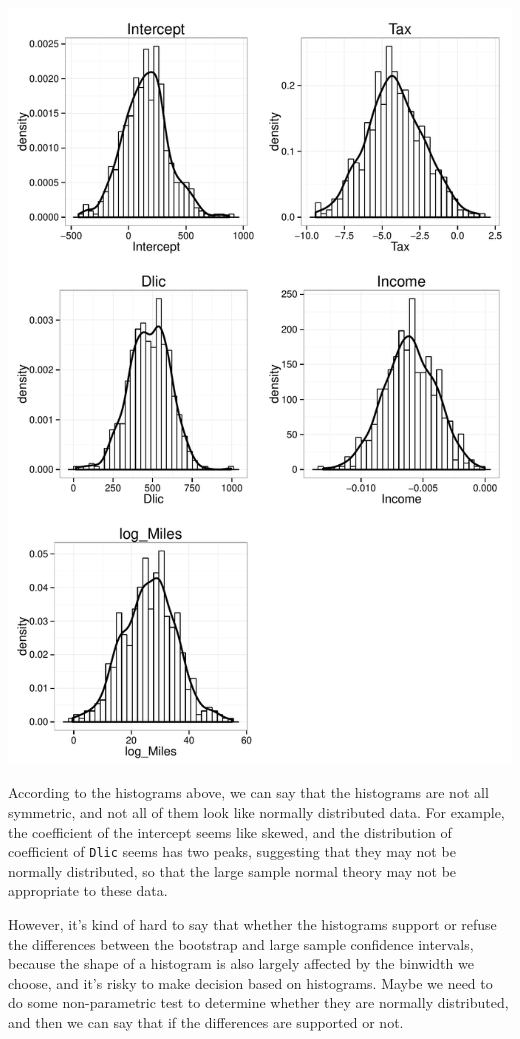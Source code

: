 \documentclass[12pt,oneside,a4paper]{article}\usepackage[]{graphicx}\usepackage[]{xcolor}
\newenvironment{knitrout}{}{} %
\newcommand{\m}[1]{\texttt{{#1}}}
\begin{document}
\begin{knitrout}
{\centering \includegraphics[width=.9\linewidth]{figure/p7102} 

}



\end{knitrout}

According to the histograms above, we can say that the histograms are not all symmetric, and not all of them look like normally distributed data. For example, the coefficient of the intercept seems like skewed, and the distribution of coefficient of \m{Dlic} seems has two peaks, suggesting that they may not be normally distributed, so that the large sample normal theory may not be appropriate to these data. 

However, it's kind of hard to say that whether the histograms support or refuse the differences between the bootstrap and large sample confidence intervals, because the shape of a histogram is also largely affected by the binwidth we choose, and it's risky to make decision based on histograms. Maybe we need to do some non-parametric test to determine whether they are normally distributed, and then we can say that if the differences are supported or not.
\end{document}
